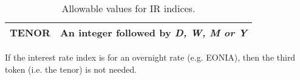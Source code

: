 \begin{table}[H]
\begin{tabular}{|l|l|}
TENOR                    & An integer followed by \emph{D, W, M or Y} \\
\hline
\end{tabular}
  \caption{Allowable values for IR indices.}
  \label{tab:IR_indices}
\end{table}

If the interest rate index is for an overnight rate (e.g. EONIA), then the third token (i.e. the tenor) is not needed.

